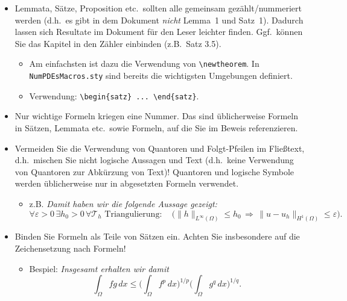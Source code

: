 \begin{itemize}
  \item Lemmata, Sätze, Proposition etc.\ sollten alle gemeinsam gezählt/nummeriert werden (d.h.\ es gibt in dem Dokument \emph{nicht} Lemma~1 und Satz~1). Dadurch lassen sich Resultate im Dokument für den Leser leichter finden. Ggf.\ können Sie das Kapitel in den Zähler einbinden (z.B.\ Satz 3.5).
        \begin{itemize}
          \item Am einfachsten ist dazu die Verwendung von \verb$\newtheorem$. 
          In \verb$NumPDEsMacros.sty$ sind bereits die wichtigsten Umgebungen definiert. 
          \item Verwendung: \verb$\begin{satz} ... \end{satz}$.
        \end{itemize}

  \item Nur wichtige Formeln kriegen eine Nummer. Das sind üblicherweise Formeln in Sät\-zen, Lemmata etc.\ sowie Formeln, auf die Sie im Beweis referenzieren.

  \item Vermeiden Sie die Verwendung von Quantoren und Folgt-Pfeilen im Fließtext, d.h.\ mischen Sie nicht logische Aussagen und Text (d.h.\ keine Verwendung von Quantoren zur Abkürzung von Text)! Quantoren und logische Symbole werden üblicherweise nur in abgesetzten Formeln verwendet.
        \begin{itemize}
          \item z.B. \emph{Damit haben wir die folgende Aussage gezeigt:
                  \begin{equation*}
                    \forall \varepsilon > 0 \, \exists h_0 > 0 \, \forall \mathcal{T}_h\text{ Triangulierung}:
                    \quad \Big( \| h \|_{L^\infty(\Omega)} \le h_0
                    \, \Longrightarrow \,
                    \| u - u_h \|_{H^1(\Omega)} \le \varepsilon \Big).
                  \end{equation*}}
        \end{itemize}

  \item Binden Sie Formeln als Teile von Sätzen ein. Achten Sie insbesondere auf die Zeichensetzung nach Formeln!
        \begin{itemize}
          \item Bespiel: \emph{Insgesamt erhalten wir damit
                  \begin{equation}\label{eq:hoelder}
                    \int_\Omega fg\,dx
                    \le \bigg(\int_\Omega f^p \, dx\bigg)^{1/p} \bigg(\int_\Omega g^q \, dx\bigg)^{1/q}.
                  \end{equation}}
        \end{itemize}


\end{itemize}
